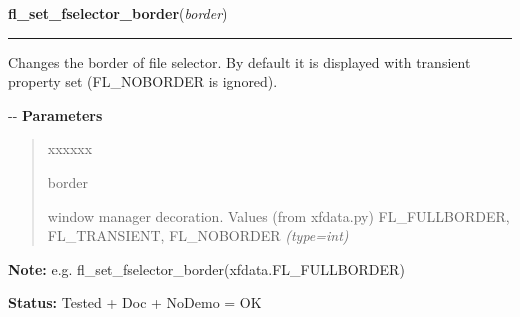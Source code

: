 \hspace{.8\funcindent}\begin{boxedminipage}{\funcwidth}

    \raggedright \textbf{fl\_set\_fselector\_border}(\textit{border})

    \vspace{-1.5ex}

    \rule{\textwidth}{0.5\fboxrule}
\setlength{\parskip}{2ex}

Changes the border of file selector. By default it is displayed with
transient property set (FL\_NOBORDER is ignored).

-{}-
\setlength{\parskip}{1ex}
      \textbf{Parameters}
      \vspace{-1ex}

      \begin{quote}
        \begin{Ventry}{xxxxxx}

          \item[border]


window manager decoration. Values (from xfdata.py) FL\_FULLBORDER,
FL\_TRANSIENT, FL\_NOBORDER
            {\it (type=int)}

        \end{Ventry}

      \end{quote}

\textbf{Note:} 
e.g. fl\_set\_fselector\_border(xfdata.FL\_FULLBORDER)


\textbf{Status:} 
Tested + Doc + NoDemo = OK


    \end{boxedminipage}

    \label{xformslib:flgoodies:fl_set_fselector_transient}

    \vspace{0.5ex}

